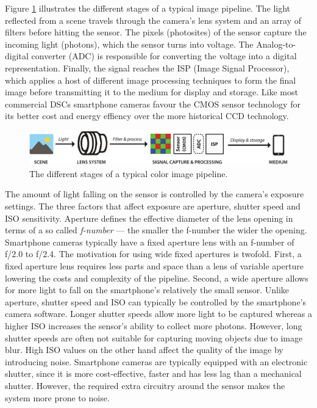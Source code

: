 \documentclass[thesis.tex]{subfiles}
\begin{document}
Figure \ref{figure:pipeline} illustrates the different stages of a typical image pipeline. The light reflected from a scene travels through the camera's lens system and an array of filters before hitting the sensor. The pixels (photosites) of the sensor capture the incoming light (photons), which the sensor turns into voltage. The Analog-to-digital converter (ADC) is responsible for converting the voltage into a digital representation. Finally, the signal reaches the ISP (Image Signal Processor), which applies a host of different image processing techniques to form the final image before transmitting it to the medium for display and storage. Like most commercial DSCs smartphone cameras favour the CMOS sensor technology for its better cost and energy effiency over the more historical CCD technology.

\begin{figure}[ht]
\centering \includegraphics[width=\textwidth]{images/pipeline}
\caption{The different stages of a typical color image pipeline.\label{figure:pipeline}}
\end{figure}

The amount of light falling on the sensor is controlled by the camera's exposure settings. The three factors that affect exposure are aperture, shutter speed and ISO sensitivity. Aperture defines the effective diameter of the lens opening in terms of a so called \textit{f-number} --- the smaller the f-number the wider the opening. Smartphone cameras typically have a fixed aperture lens with an f-number of f/2.0 to f/2.4. The motivation for using wide fixed apertures is twofold. First, a fixed aperture lens requires less parts and space than a lens of variable aperture lowering the costs and complexity of the pipeline. Second, a wide aperture allows for more light to fall on the smartphone's relatively the small sensor. Unlike aperture, shutter speed and ISO can typically be controlled by the smartphone's camera software. Longer shutter speeds allow more light to be captured whereas a higher ISO increases the sensor's ability to collect more photons. However, long shutter speeds are often not suitable for capturing moving objects due to image blur. High ISO values on the other hand affect the quality of the image by introducing noise. Smartphone cameras are typically equipped with an electronic shutter, since it is more cost-effective, faster and has less lag than a mechanical shutter. However, the required extra circuitry around the sensor makes the system more prone to noise.
\end{document}
